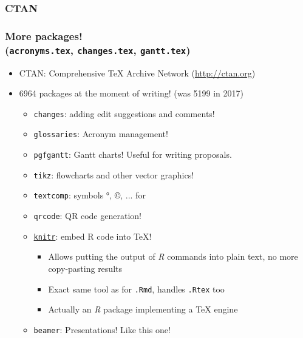 \documentclass[colorlinks]{beamer} %
\begin{document}
  \subsubsection{CTAN}
  \begin{frame}
    \frametitle{More packages! \\ (\texttt{acronyms.tex}, \texttt{changes.tex}, \texttt{gantt.tex})}
    \begin{itemize}
     \item CTAN: Comprehensive \TeX{} Archive Network (\href{http://ctan.org}{http://ctan.org})
     \item 6964 packages at the moment of writing! (was 5199 in 2017)
      \begin{itemize}
      \item \texttt{changes}: adding edit suggestions and comments!
      \item \texttt{glossaries}: Acronym management!
      \item \texttt{pgfgantt}: Gantt charts! Useful for writing proposals.
      \item \texttt{tikz}: flowcharts and other vector graphics!
      \item \texttt{textcomp}: symbols °, ©, ... for 
      \item \texttt{qrcode}: QR code generation!
      \item \href{https://github.com/yihui/knitr-examples/blob/master/005-latex.Rtex}{\texttt{knitr}}: embed R code into \TeX{}!
      \begin{itemize}
	\item Allows putting the output of \textit{R} commands into plain text, no more copy-pasting results
	\item Exact same tool as for \texttt{.Rmd}, handles \texttt{.Rtex} too
	\item Actually an \textit{R} package implementing a \TeX{} engine
      \end{itemize}
      \item \texttt{beamer}: Presentations! Like this one!
      \end{itemize}
    \end{itemize}
  \end{frame}
\end{document}
